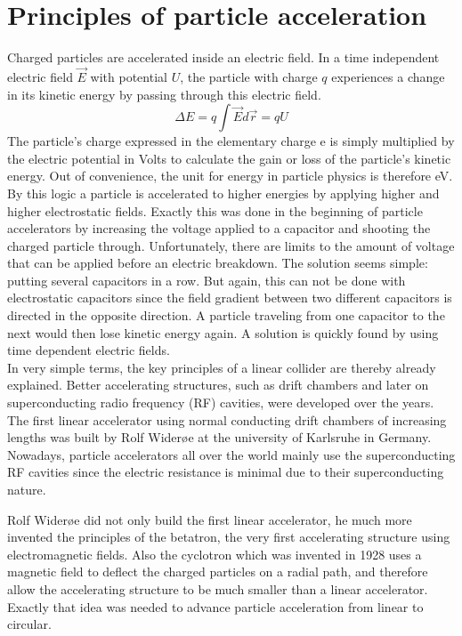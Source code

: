 \section{Principles of particle acceleration}
\label{AcceleratorPhysics}
Charged particles are accelerated inside an electric field. 
In a time independent electric field $\vec{E}$ with potential $U$, the particle with charge $q$ experiences a change in its kinetic energy by passing through this electric field.
\begin{equation}
 \Delta E = q \int \vec{E}d\vec{r} = qU
\end{equation}
The particle's charge expressed in the elementary charge e is simply multiplied by the electric potential in Volts to calculate the gain or loss of the particle's kinetic energy. 
Out of convenience, the unit for energy in particle physics is therefore eV.\\
By this logic a particle is accelerated to higher energies by applying higher and higher electrostatic fields. 
Exactly this was done in the beginning of particle accelerators by increasing the voltage applied to a capacitor and shooting the charged particle through. 
Unfortunately, there are limits to the amount of voltage that can be applied before an electric breakdown.
The solution seems simple: putting several capacitors in a row.
But again, this can not be done with electrostatic capacitors since the field gradient between two different capacitors is directed in the opposite direction.
A particle traveling from one capacitor to the next would then lose kinetic energy again.
A solution is quickly found by using time dependent electric fields.\\
In very simple terms, the key principles of a linear collider are thereby already explained.
Better accelerating structures, such as drift chambers and later on superconducting radio frequency (RF) cavities, were developed over the years.
The first linear accelerator using normal conducting drift chambers of increasing lengths was built by Rolf Wider\o e at the university of Karlsruhe in Germany.
Nowadays, particle accelerators all over the world mainly use the superconducting RF cavities since the electric resistance is minimal due to their superconducting nature.

Rolf Wider\o e did not only build the first linear accelerator, he much more invented the principles of the betatron, the very first accelerating structure using electromagnetic fields.
Also the cyclotron which was invented in 1928 uses a magnetic field to deflect the charged particles on a radial path, and therefore allow the accelerating structure to be much smaller than a linear accelerator.
Exactly that idea was needed to advance particle acceleration from linear to circular.

